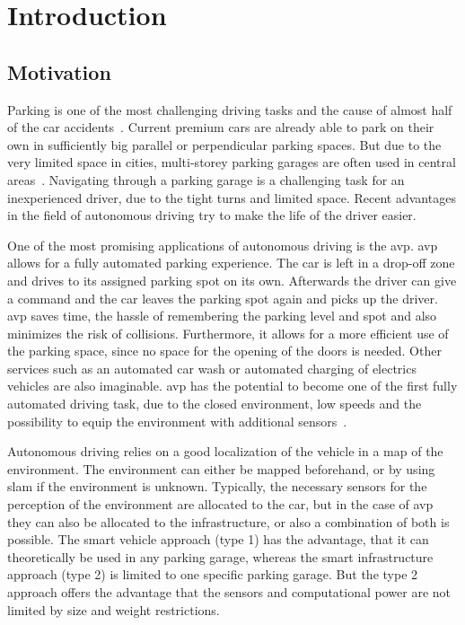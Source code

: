 \chapter{Introduction}
\label{ch:Introduction}

\section{Motivation}
Parking is one of the most challenging driving tasks and the cause of almost half of the car accidents~\cite{accident2015}.
Current premium cars are already able to park on their own in sufficiently big parallel or perpendicular parking spaces.
But due to the very limited space in cities, multi-storey parking garages are often used in central areas~\cite{Khalid2021}.
Navigating through a parking garage is a challenging task for an inexperienced driver, due to the tight turns and limited space.
Recent advantages in the field of autonomous driving try to make the life of the driver easier.

One of the most promising applications of autonomous driving is the \gls{avp}.
\gls{avp} allows for a fully automated parking experience.
The car is left in a drop-off zone and drives to its assigned parking spot on its own.
Afterwards the driver can give a command and the car leaves the parking spot again and picks up the driver.
\gls{avp} saves time, the hassle of remembering the parking level and spot and also minimizes the risk of collisions.
Furthermore, it allows for a more efficient use of the parking space, since no space for the opening of the doors is needed.
Other services such as an automated car wash or automated charging of electrics vehicles are also imaginable.
\gls{avp} has the potential to become one of the first fully automated driving task, due to the closed environment, low speeds and the possibility to equip the environment with additional sensors~\cite{Banzhaf2017}.

Autonomous driving relies on a good localization of the vehicle in a map of the environment.
The environment can either be mapped beforehand, or by using \gls{slam} if the environment is unknown.
Typically, the necessary sensors for the perception of the environment are allocated to the car, but in the case of \gls{avp} they can also be allocated to the infrastructure, or also a combination of both is possible.
The smart vehicle approach (type 1) has the advantage, that it can theoretically be used in any parking garage, whereas the smart infrastructure approach (type 2) is limited to one specific parking garage.
But the type 2 approach offers the advantage that the sensors and computational power are not limited by size and weight restrictions.

